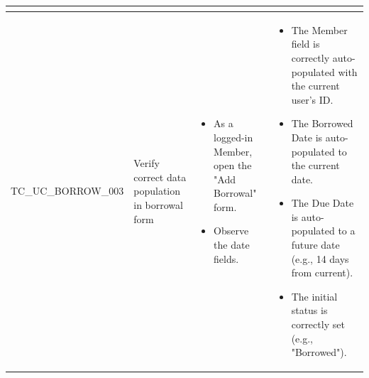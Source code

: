 \documentclass[10pt, a4paper]{report}
\begin{document}
\begin{longtable}{|>{\raggedright\arraybackslash}p{3.5cm}|>{\raggedright\arraybackslash}p{4cm}|>{\raggedright\arraybackslash}p{4cm}|>{\raggedright\arraybackslash}p{5cm}|}
\begin{itemize}[noitemsep, topsep=0pt, partopsep=0pt, leftmargin=*]
    \end{itemize} \\ \hline
TC\_UC\_BORROW\_003 & Verify correct data population in borrowal form & 
    \begin{itemize}[noitemsep, topsep=0pt, partopsep=0pt, leftmargin=*]
        \item As a logged-in Member, open the "Add Borrowal" form.
        \item Observe the date fields.
    \end{itemize} & 
    \begin{itemize}[noitemsep, topsep=0pt, partopsep=0pt, leftmargin=*]
        \item The Member field is correctly auto-populated with the current user's ID.
        \item The Borrowed Date is auto-populated to the current date.
        \item The Due Date is auto-populated to a future date (e.g., 14 days from current).
        \item The initial status is correctly set (e.g., "Borrowed").
    \end{itemize} \\ \hline


\end{longtable}
\end{document}

